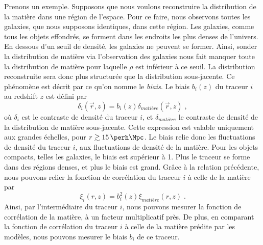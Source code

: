 \documentclass[11pt, twoside, a4paper, openright]{report}
\begin{document}
Prenons un exemple. Supposons que nous voulons reconstruire la distribution de la matière dans une région de l'espace. Pour ce faire, nous observons toutes les galaxies, que nous supposons identiques, dans cette région.
Les galaxies, comme tous les objets effondrés, se forment dans les endroits les plus denses de l'univers.
En dessous d'un seuil de densité, les galaxies ne peuvent se former.
Ainsi, sonder la distribution de matière via l'observation des galaxies nous fait manquer toute la distribution de matière pour laquelle $\rho$ est inférieur à ce seuil.
La distribution reconstruite sera donc plus structurée que la distribution sous-jacente. Ce phénomène est décrit par ce qu'on nomme le \emph{biais}. Le biais $b_i(z)$ du traceur $i$ au redshift $z$ est défini par
\begin{equation}
  \label{eq:biais1}
  \delta_{i}(\vec r, z) = b_{i}(z) \delta_{matière}(\vec r, z) \; , 
\end{equation}
où $\delta_{i}$ est le contraste de densité du traceur $i$, et $\delta_{matière}$ le contraste de densité de la distribution de matière sous-jacente. Cette expression est valable uniquement aux grandes échelles, pour $r \gtrsim \SI{15}{\perh\Mpc}$. Le biais relie donc les fluctuations de densité du traceur $i$, aux fluctuations de densité de la matière. Pour les objets compacts, telles les galaxies, le biais est supérieur à 1. Plus le traceur se forme dans des régions denses, et plus le biais est grand. Grâce à la relation précédente, nous pouvons relier la fonction de corrélation du traceur $i$ à celle de la matière par
\begin{equation}
  \label{eq:biais2}
  \xi_{i}(r, z) = b_{i}^2(z) \xi_{matière}(r, z)  \; .
\end{equation}
Ainsi, par l'intermédiaire du traceur $i$, nous pouvons mesurer la fonction de corrélation de la matière, à un facteur multiplicatif près. De plus, en comparant la fonction de corrélation du traceur $i$ à celle de la matière prédite par les modèles, nous pouvons mesurer le biais $b_{i}$ de ce traceur. 
\end{document}
